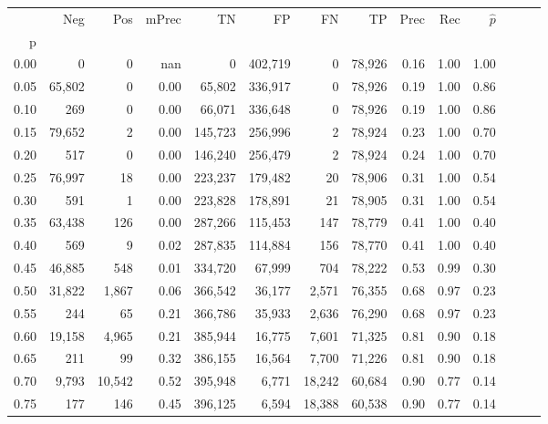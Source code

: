 \begin{tabular}{rrrrrrrrrrrrrr}
\toprule
{} &     Neg &     Pos & mPrec &       TN &       FP &      FN &      TP &  Prec &   Rec & $\hat{p}$ \\
p    &         &         &       &          &          &         &         &       &       &           \\
\midrule
0.00 &       0 &       0 &   nan &        0 &  402,719 &       0 &  78,926 &  0.16 &  1.00 &      1.00 \\
0.05 &  65,802 &       0 &  0.00 &   65,802 &  336,917 &       0 &  78,926 &  0.19 &  1.00 &      0.86 \\
0.10 &     269 &       0 &  0.00 &   66,071 &  336,648 &       0 &  78,926 &  0.19 &  1.00 &      0.86 \\
0.15 &  79,652 &       2 &  0.00 &  145,723 &  256,996 &       2 &  78,924 &  0.23 &  1.00 &      0.70 \\
0.20 &     517 &       0 &  0.00 &  146,240 &  256,479 &       2 &  78,924 &  0.24 &  1.00 &      0.70 \\
0.25 &  76,997 &      18 &  0.00 &  223,237 &  179,482 &      20 &  78,906 &  0.31 &  1.00 &      0.54 \\
0.30 &     591 &       1 &  0.00 &  223,828 &  178,891 &      21 &  78,905 &  0.31 &  1.00 &      0.54 \\
0.35 &  63,438 &     126 &  0.00 &  287,266 &  115,453 &     147 &  78,779 &  0.41 &  1.00 &      0.40 \\
0.40 &     569 &       9 &  0.02 &  287,835 &  114,884 &     156 &  78,770 &  0.41 &  1.00 &      0.40 \\
0.45 &  46,885 &     548 &  0.01 &  334,720 &   67,999 &     704 &  78,222 &  0.53 &  0.99 &      0.30 \\
0.50 &  31,822 &   1,867 &  0.06 &  366,542 &   36,177 &   2,571 &  76,355 &  0.68 &  0.97 &      0.23 \\
0.55 &     244 &      65 &  0.21 &  366,786 &   35,933 &   2,636 &  76,290 &  0.68 &  0.97 &      0.23 \\
0.60 &  19,158 &   4,965 &  0.21 &  385,944 &   16,775 &   7,601 &  71,325 &  0.81 &  0.90 &      0.18 \\
0.65 &     211 &      99 &  0.32 &  386,155 &   16,564 &   7,700 &  71,226 &  0.81 &  0.90 &      0.18 \\
0.70 &   9,793 &  10,542 &  0.52 &  395,948 &    6,771 &  18,242 &  60,684 &  0.90 &  0.77 &      0.14 \\
0.75 &     177 &     146 &  0.45 &  396,125 &    6,594 &  18,388 &  60,538 &  0.90 &  0.77 &      0.14 \\

\end{tabular}
